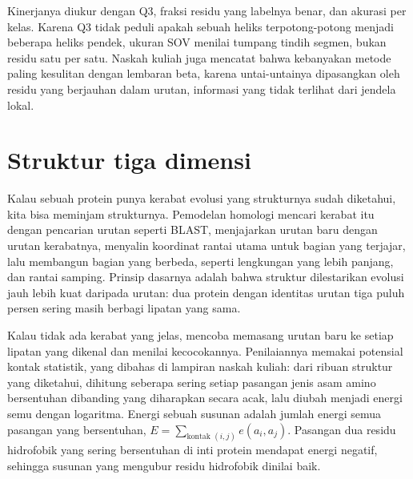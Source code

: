 Kinerjanya diukur dengan Q3, fraksi residu yang labelnya benar, dan akurasi per kelas. Karena Q3 tidak peduli apakah sebuah
heliks terpotong-potong menjadi beberapa heliks pendek, ukuran SOV menilai tumpang tindih segmen, bukan residu satu per satu.
Naskah kuliah juga mencatat bahwa kebanyakan metode paling kesulitan dengan lembaran beta, karena untai-untainya dipasangkan
oleh residu yang berjauhan dalam urutan, informasi yang tidak terlihat dari jendela lokal.

\section{Struktur tiga dimensi}

Kalau sebuah protein punya kerabat evolusi yang strukturnya sudah diketahui, kita bisa meminjam strukturnya. Pemodelan homologi
mencari kerabat itu dengan pencarian urutan seperti BLAST, menjajarkan urutan baru dengan urutan kerabatnya, menyalin koordinat
rantai utama untuk bagian yang terjajar, lalu membangun bagian yang berbeda, seperti lengkungan yang lebih panjang, dan rantai
samping. Prinsip dasarnya adalah bahwa struktur dilestarikan evolusi jauh lebih kuat daripada urutan: dua protein dengan
identitas urutan tiga puluh persen sering masih berbagi lipatan yang sama.

Kalau tidak ada kerabat yang jelas,  mencoba memasang urutan baru ke setiap lipatan yang dikenal dan menilai
kecocokannya. Penilaiannya memakai potensial kontak statistik, yang dibahas di lampiran naskah kuliah: dari ribuan struktur
yang diketahui, dihitung seberapa sering setiap pasangan jenis asam amino bersentuhan dibanding yang diharapkan secara acak,
lalu diubah menjadi energi semu dengan logaritma. Energi sebuah susunan adalah jumlah energi semua pasangan yang bersentuhan,
$E=\sum_{\text{kontak }(i,j)}e(a_i,a_j)$. Pasangan dua residu hidrofobik yang sering bersentuhan di inti protein mendapat energi
negatif, sehingga susunan yang mengubur residu hidrofobik dinilai baik.

